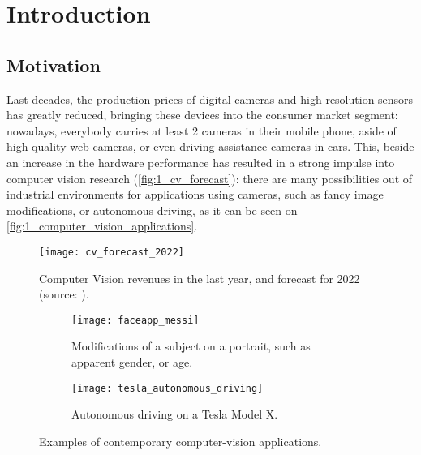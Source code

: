 \chapter{Introduction}
\section{Motivation}
	
Last decades, the production prices of digital cameras and high-resolution sensors has greatly reduced, bringing these devices into the consumer market segment: nowadays, everybody carries at least 2 cameras in their mobile phone, aside of high-quality web cameras, or even driving-assistance cameras in cars. This, beside an increase in the hardware performance has resulted in a strong impulse into computer vision research (\autoref{fig:1_cv_forecast}): there are many possibilities out of industrial environments for applications using cameras, such as fancy image modifications, or autonomous driving, as it can be seen on \autoref{fig:1_computer_vision_applications}.

\begin{figure}[h]
	\centering
	\texttt{[image: cv\_forecast\_2022]}
	\caption{Computer Vision revenues in the last year, and forecast for 2022 (source: \cite{cv_forecast}).}
	\label{fig:1_cv_forecast}
\end{figure}


\begin{figure}[h]
	\centering
	\begin{subfigure}[t]{0.45\linewidth}
		\centering
		\texttt{[image: faceapp\_messi]}
		\caption{Modifications of a subject on a portrait, such as apparent gender, or age.}
	\end{subfigure}
	\begin{subfigure}[t]{0.45\linewidth}
		\centering
		\texttt{[image: tesla\_autonomous\_driving]}
		\caption{Autonomous driving on a Tesla Model X.}
	\end{subfigure}
	\caption{Examples of contemporary computer-vision applications.}
	\label{fig:1_computer_vision_applications}
\end{figure}



